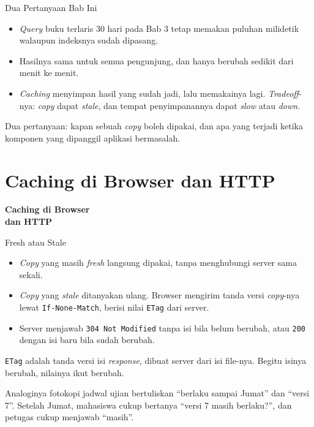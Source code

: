 \documentclass[aspectratio=169, table, 12pt]{beamer}
\begin{document}
\begin{frame}{{\Large Dua Pertanyaan Bab Ini}}
  \vspace{10pt}
  \begin{itemize}
    \item \textit{Query} buku terlaris 30 hari pada Bab 3 tetap memakan puluhan
          milidetik walaupun indeksnya sudah dipasang.
    \item Hasilnya sama untuk semua pengunjung, dan hanya berubah sedikit
          dari menit ke menit.
    \item \textit{Caching} menyimpan hasil yang sudah jadi, lalu memakainya
          lagi. \textit{Tradeoff}-nya: \textit{copy} dapat \textit{stale}, dan tempat
          penyimpanannya dapat \textit{slow} atau \textit{down}.
  \end{itemize}
  \vspace{8pt}
  {\footnotesize Dua pertanyaan: kapan sebuah \textit{copy} boleh dipakai, dan apa
  yang terjadi ketika komponen yang dipanggil aplikasi bermasalah.}
\end{frame}

\section{Caching di Browser dan HTTP}

\begin{frame}{\hfill}
  \centering
  \Huge{\textbf{Caching di Browser\\dan HTTP}}
\end{frame}

\begin{frame}{{\Large Fresh atau Stale}}
  \vspace{10pt}
  \begin{itemize}
    \item \textit{Copy} yang masih \textit{fresh} langsung dipakai, tanpa menghubungi server
          sama sekali.
    \item \textit{Copy} yang \textit{stale} ditanyakan ulang. Browser mengirim tanda versi
          \textit{copy}-nya lewat \texttt{If-None-Match}, berisi nilai \texttt{ETag}
          dari server.
    \item Server menjawab \texttt{304 Not Modified} tanpa isi bila belum
          berubah, atau \texttt{200} dengan isi baru bila sudah berubah.
  \end{itemize}
  \vspace{6pt}
  {\footnotesize \texttt{ETag} adalah tanda versi isi \textit{response}, dibuat server
  dari isi file-nya. Begitu isinya berubah, nilainya ikut berubah.

  \vspace{4pt}
  Analoginya fotokopi jadwal ujian bertuliskan ``berlaku sampai Jumat'' dan
  ``versi 7''. Setelah Jumat, mahasiswa cukup bertanya ``versi 7 masih
  berlaku?'', dan petugas cukup menjawab ``masih''.}
\end{frame}
\end{document}

